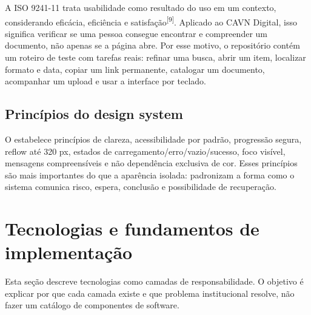 \documentclass[11pt,a4paper]{article}
\newcommand{\internal}[1]{\path{#1}}
\newcommand{\sourcecite}[1]{\textsuperscript{[#1]}}
\begin{document}
A ISO 9241-11 trata usabilidade como resultado do uso em um contexto, considerando eficácia, eficiência e satisfação\sourcecite{9}. Aplicado ao CAVN Digital, isso significa verificar se uma pessoa consegue encontrar e compreender um documento, não apenas se a página abre. Por esse motivo, o repositório contém um roteiro de teste com tarefas reais: refinar uma busca, abrir um item, localizar formato e data, copiar um link permanente, catalogar um documento, acompanhar um upload e usar a interface por teclado.

\subsection{Princípios do design system}

O \internal{docs/design-system.md} estabelece princípios de clareza, acessibilidade por padrão, progressão segura, reflow até 320 px, estados de carregamento/erro/vazio/sucesso, foco visível, mensagens compreensíveis e não dependência exclusiva de cor. Esses princípios são mais importantes do que a aparência isolada: padronizam a forma como o sistema comunica risco, espera, conclusão e possibilidade de recuperação.

\section{Tecnologias e fundamentos de implementação}

Esta seção descreve tecnologias como camadas de responsabilidade. O objetivo é explicar por que cada camada existe e que problema institucional resolve, não fazer um catálogo de componentes de software.
\end{document}
